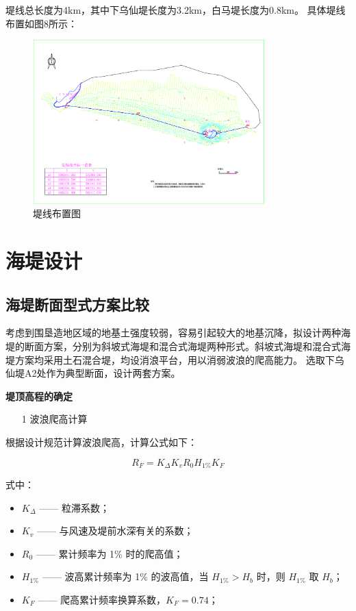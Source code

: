 \documentclass[UTF8, a4paper, 12pt]{ctexart} %
\begin{document}
堤线总长度为4km，其中下乌仙堤长度为3.2km，白马堤长度为0.8km。
具体堤线布置如图8所示：
\begin{figure}[h]
    \centering
    \includegraphics[width=0.8\textwidth]{10.png}
    \caption{堤线布置图}
    \label{fig:sea_dike_layout}
\end{figure}
\newpage
\section{海堤设计}
\subsection{海堤断面型式方案比较}
考虑到围垦造地区域的地基土强度较弱，容易引起较大的地基沉降，拟设计两种海堤的断面方案，分别为斜坡式海堤和混合式海堤两种形式。斜坡式海堤和混合式海堤方案均采用土石混合堤，均设消浪平台，用以消弱波浪的爬高能力。
选取下乌仙堤A2处作为典型断面，设计两套方案。
\par
\textbf{堤顶高程的确定}
\par
\begin{itemize}
    \item[1] 波浪爬高计算
\end{itemize}
根据设计规范计算波浪爬高，计算公式如下：

\begin{equation}
    R_F = K_\Delta K_v R_0 H_{1\%} K_F
\end{equation}

式中：
\begin{itemize}
    \item $K_\Delta$ —— 粒滞系数；
    \item $K_v$ —— 与风速及堤前水深有关的系数；
    \item $R_0$ —— 累计频率为 1\% 时的爬高值；
    \item $H_{1\%}$ —— 波高累计频率为 1\% 的波高值，当 $H_{1\%} > H_b$ 时，则 $H_{1\%}$ 取 $H_b$；
    \item $K_F$ —— 爬高累计频率换算系数，$K_F = 0.74$；
\end{itemize}
\end{document}
